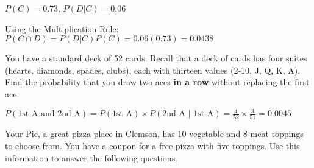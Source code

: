 \documentclass[noanswers]{exam}
\begin{document}
\begin{questions}
\begin{solution}[\stretch{1}]
\vspace{1mm}
$P(C)=0.73$, $P(D|C)=0.06$

\vspace{3mm}
Using the Multiplication Rule: $P(C \cap D) = P(D|C)P(C) = 0.06(0.73) = 0.0438$
\vspace{1mm}
\end{solution}

\question You have a standard deck of 52 cards. Recall that a deck of cards has four suites (hearts, diamonds, spades, clubs), each with thirteen values (2-10, J, Q, K, A). Find the probability that you draw two aces \textbf{in a row} without replacing the first ace. 
	
	\begin{solution}[\stretch{1}]
	\vspace{1mm}
	$P(\text{1st A and 2nd A})=P(\text{1st A})\times P(\text{2nd A }|\text{ 1st A})=\frac{4}{52}\times\frac{3}{51}=0.0045$
	\vspace{1mm}
	\end{solution}
	
\question Your Pie, a great pizza place in Clemson, has 10 vegetable and 8 meat toppings to choose from. You have a coupon for a free pizza with five toppings. Use this information to answer the following questions.

\vspace{3mm}

\end{questions}
\end{document}
